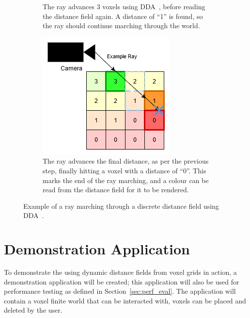 \begin{figure}[htbp]
\begin{subfigure}[t]{0.32\textwidth}
    \caption{The ray advances 3 voxels using DDA~\protect\cite{amanatides1987fast}, before reading the distance
      field again. A distance of ``1'' is found, so the ray should continue marching through the world.}
  \end{subfigure}
  \hfill
  \begin{subfigure}[t]{0.32\textwidth}
    \centering
    \includegraphics[width=\textwidth]{figures/df_dda_3.drawio.png}
    \caption{The ray advances the final distance, as per the previous step, finally hitting a voxel with a distance
      of ``0''. This marks the end of the ray marching, and a colour can be read from the distance field for it to
      be rendered.}
  \end{subfigure}
  \caption{Example of a ray marching through a discrete distance field using DDA~\protect\cite{amanatides1987fast}.}
  \label{fig:df_dda}
\end{figure}

\section{Demonstration Application} \label{sec:demo_app}
To demonstrate the using dynamic distance fields from voxel grids in action, a demonstration application will be
created; this application will also be used for performance testing as defined in Section~\ref{sec:perf_eval}. The
application will contain a voxel finite world that can be interacted with, voxels can be placed and deleted by the user.


